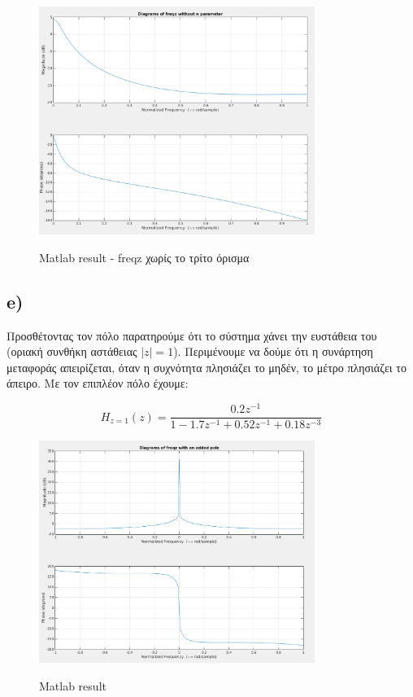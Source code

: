 \documentclass[11pt]{article}
\begin{document}
\begin{figure}[H]
    \centering
   \includegraphics[scale=0.5, width=0.8\textwidth]{photos/1d-freqz-without_n.png} \\
    \caption{Matlab result - freqz χωρίς το τρίτο όρισμα}
\end{figure}

\subsection*{e)}
Προσθέτοντας τον πόλο παρατηρούμε ότι το σύστημα χάνει την ευστάθεια του (οριακή συνθήκη αστάθειας $|z|=1$). Περιμένουμε να δούμε ότι η συνάρτηση μεταφοράς απειρίζεται, όταν η συχνότητα πλησιάζει το μηδέν, το μέτρο πλησιάζει το άπειρο. Με τον επιπλέον πόλο έχουμε:

\[
    Η_{z=1}(z) = \frac{0.2z^{-1}}{1 - 1.7z^{-1} + 0.52z^{-1} + 0.18z^{-3}}
\]

\begin{figure}[H]
    \centering
   \includegraphics[scale=0.5, width=0.8\textwidth]{photos/1d-with-new-pole-fix.png} \\
    \caption{Matlab result}
\end{figure}
\end{document}
